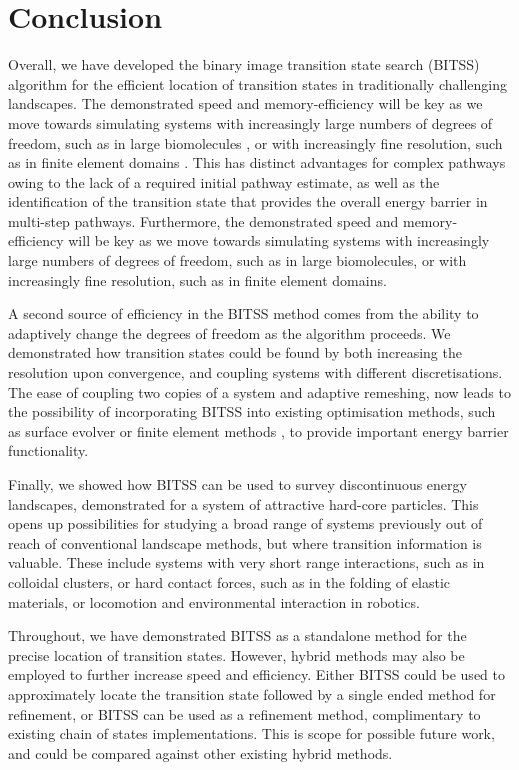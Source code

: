 \documentclass[twocolumn,10pt]{revtex4}
\begin{document}
\section{Conclusion}
Overall, we have developed the binary image transition state search (BITSS) algorithm for the efficient location of transition states in traditionally challenging landscapes.
The demonstrated speed and memory-efficiency will be key as we move towards simulating systems with increasingly large numbers of degrees of freedom, such as in large biomolecules \cite{Lee2018}, or with increasingly fine resolution, such as in finite element domains \cite{Kolev2021}.
This has distinct advantages for complex pathways owing to the lack of a required initial pathway estimate, as well as the identification of the transition state that provides the overall energy barrier in multi-step pathways.
Furthermore, the demonstrated speed and memory-efficiency will be key as we move towards simulating systems with increasingly large numbers of degrees of freedom, such as in large biomolecules, or with increasingly fine resolution, such as in finite element domains.

A second source of efficiency in the BITSS method comes from the ability to adaptively change the degrees of freedom as the algorithm proceeds.
We demonstrated how transition states could be found by both increasing the resolution upon convergence, and coupling systems with different discretisations.
The ease of coupling two copies of a system and adaptive remeshing, now leads to the possibility of incorporating BITSS into existing optimisation methods, such as surface evolver \cite{Brakke1992} or finite element methods \cite{Kolev2021}, to provide important energy barrier functionality.

Finally, we showed how BITSS can be used to survey discontinuous energy landscapes, demonstrated for a system of attractive hard-core particles.
This opens up possibilities for studying a broad range of systems previously out of reach of conventional landscape methods, but where transition information is valuable.
These include systems with very short range interactions, such as in colloidal clusters, or hard contact forces, such as in the folding of elastic materials, or locomotion and environmental interaction in robotics.

Throughout, we have demonstrated BITSS as a standalone method for the precise location of transition states.
However, hybrid methods may also be employed to further increase speed and efficiency.
Either BITSS could be used to approximately locate the transition state followed by a single ended method for refinement, or BITSS can be used as a refinement method, complimentary to existing chain of states implementations.
This is scope for possible future work, and could be compared against other existing hybrid methods.
\end{document}
